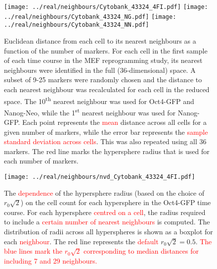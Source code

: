 \documentclass{article}
\newcommand\revised[1]{\textcolor{red}{#1}}
\begin{document}
\begin{figure}[p]
    \begin{center}
        \texttt{[image: ../real/neighbours/Cytobank\_43324\_4FI.pdf]}
        \texttt{[image: ../real/neighbours/Cytobank\_43324\_NG.pdf]}
        \texttt{[image: ../real/neighbours/Cytobank\_43324\_NN.pdf]}          
    \end{center}
    \caption{
        Euclidean distance from each cell to its nearest neighbours as a function of the number of markers.
        For each cell in the first sample of each time course in the MEF reprogramming study, its nearest neighbours were identified in the full (36-dimensional) space.
        A subset of 9-25 markers were randomly chosen and the distance to each nearest neighbour was recalculated for each cell in the reduced space.
        The 10\textsuperscript{th} nearest neighbour was used for Oct4-GFP and Nanog-Neo, while the 1\textsuperscript{st} nearest neighbour was used for Nanog-GFP.
        Each point represents the \revised{mean} distance across all cells for a given number of markers, while the error bar represents the \revised{sample standard deviation across cells}.
        This was also repeated using all 36 markers.
        The red line marks the hypersphere radius that is used for each number of markers.
    }
    \label{fig:radius}
\end{figure}

\begin{figure}[p]
    \begin{center}
        \texttt{[image: ../real/neighbours/nvd\_Cytobank\_43324\_4FI.pdf]}
    \end{center}
    \caption{The \revised{dependence} of the hypersphere radius (based on the choice of $r_0\sqrt{2}$) on the cell count for each hypersphere in the Oct4-GFP time course.
        For each hypersphere \revised{centred on a cell}, the radius required to include a \revised{certain number of nearest neighbours} is computed.
        The distribution of radii across all hyperspheres is shown as a boxplot for each \revised{neighbour}.
        The red line represents the \revised{default} $r_0\sqrt{2}=0.5$.
        \revised{The blue lines mark the $r_0\sqrt{2}$ corresponding to median distances for including 7 and 29 neighbours.}
    }
    \label{fig:nvd}
\end{figure}
\end{document}
